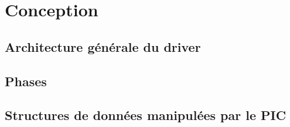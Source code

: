 \section{Conception}

\subsection{Architecture générale du driver}
\vfill
\pagebreak
\subsection{Phases}
\vfill
\pagebreak

\subsection{Structures de données manipulées par le PIC}
\hfill\\
\vfill
\pagebreak
\hfill\\
\vfill
\pagebreak
